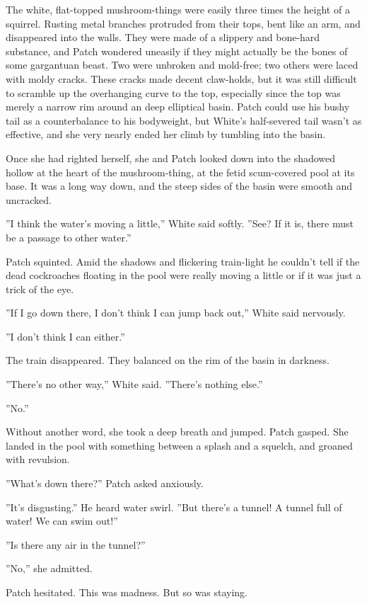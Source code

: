 \documentclass[12pt]{book}
\begin{document}
The white, flat-topped mushroom-things were easily three times the height of a squirrel. Rusting metal branches protruded from their tops, bent like an arm, and disappeared into the walls. They were made of a slippery and bone-hard substance, and Patch wondered uneasily if they might actually be the bones of some gargantuan beast. Two were unbroken and mold-free; two others were laced with moldy cracks. These cracks made decent claw-holds, but it was still difficult to scramble up the overhanging curve to the top, especially since the top was merely a narrow rim around an deep elliptical basin. Patch could use his bushy tail as a counterbalance to his bodyweight, but White's half-severed tail wasn't as effective, and she very nearly ended her climb by tumbling into the basin.

Once she had righted herself, she and Patch looked down into the shadowed hollow at the heart of the mushroom-thing, at the fetid scum-covered pool at its base. It was a long way down, and the steep sides of the basin were smooth and uncracked.

''I think the water's moving a little,'' White said softly. ''See? If it is, there must be a passage to other water.''

Patch squinted. Amid the shadows and flickering train-light he couldn't tell if the dead cockroaches floating in the pool were really moving a little or if it was just a trick of the eye.

''If I go down there, I don't think I can jump back out,'' White said nervously.

''I don't think I can either.''

The train disappeared. They balanced on the rim of the basin in darkness.

''There's no other way,'' White said. ''There's nothing else.''

''No.''

Without another word, she took a deep breath and jumped. Patch gasped. She landed in the pool with something between a splash and a squelch, and groaned with revulsion.

''What's down there?'' Patch asked anxiously.

''It's disgusting.'' He heard water swirl. ''But there's a tunnel! A tunnel full of water! We can swim out!''

''Is there any air in the tunnel?''

''No,'' she admitted.

Patch hesitated. This was madness. But so was staying.
\end{document}
